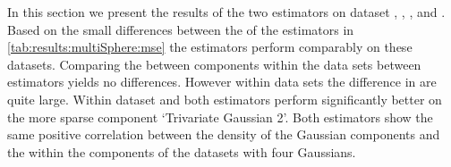 In this section we present the results of the two estimators on dataset \ferdosiTwo, \baakmanTwo, \ferdosiThree, and \baakmanThree.
	Based on the small differences between the \mses of the estimators in \cref{tab:results:multiSphere:mse} the estimators perform comparably on these datasets. 
	Comparing the \MSE between components within the data sets between estimators yields no differences. However within data sets the difference in \mses are quite large.
	Within dataset \ferdosiTwo and \baakmanTwo both estimators perform significantly better on the more sparse component `Trivariate Gaussian 2'.
	Both estimators show the same positive correlation between the density of the Gaussian components and the \MSE within the components of the datasets with four Gaussians.









